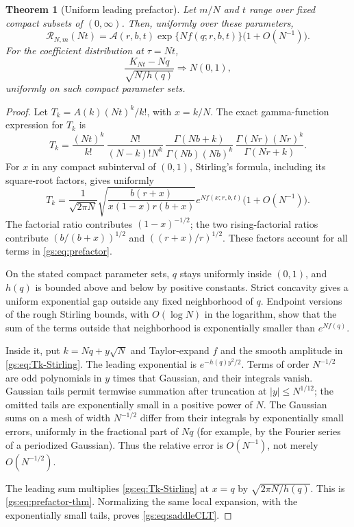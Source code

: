 \documentclass[11pt,a4paper]{article}
\numberwithin{equation}{section}
\newtheorem{theorem}{Theorem}[section]
\theoremstyle{definition}
\theoremstyle{remark}
\newcommand{\Rgs}{\mathcal R}
\begin{document}
\begin{theorem}[Uniform leading prefactor]\label{gs:thm:prefactor}
Let $m/N$ and $t$ range over fixed compact subsets of $(0,\infty)$.
Then, uniformly over these parameters,
\begin{equation}\label{gs:eq:prefactor-thm}
 \Rgs_{N,m}(Nt)=\mathcal A(r,b,t)
       \exp\{Nf(q;r,b,t)\}\bigl(1+O(N^{-1})\bigr).
\end{equation}
For the coefficient distribution at $\tau=Nt$,
\begin{equation}\label{gs:eq:saddleCLT}
 \frac{K_{Nt}-Nq}{\sqrt{N/h(q)}}\Longrightarrow N(0,1),
\end{equation}
uniformly on such compact parameter sets.
\end{theorem}
\begin{proof}
Let $T_k=A(k)(Nt)^k/k!$, with $x=k/N$.
The exact gamma-function expression for $T_k$ is
\begin{equation}\label{gs:eq:Tk}
 T_k=\frac{(Nt)^k}{k!}\,
 \frac{N!}{(N-k)!N^k}\,
 \frac{\Gamma(Nb+k)}{\Gamma(Nb)(Nb)^k}\,
 \frac{\Gamma(Nr)(Nr)^k}{\Gamma(Nr+k)}.
\end{equation}
For $x$ in any compact subinterval of $(0,1)$, Stirling's formula, including
its square-root factors, gives uniformly
\begin{equation}\label{gs:eq:Tk-Stirling}
 T_k=\frac1{\sqrt{2\pi N}}
 \sqrt{\frac{b(r+x)}{x(1-x)r(b+x)}}
 e^{Nf(x;r,b,t)}\bigl(1+O(N^{-1})\bigr).
\end{equation}
The factorial ratio contributes $(1-x)^{-1/2}$; the two rising-factorial
ratios contribute $(b/(b+x))^{1/2}$ and $((r+x)/r)^{1/2}$.
These factors account for all terms in \eqref{gs:eq:prefactor}.

On the stated compact parameter sets, $q$ stays uniformly inside $(0,1)$,
and $h(q)$ is bounded above and below by positive constants. Strict
concavity gives a uniform exponential gap outside any fixed neighborhood
of $q$. Endpoint versions of the rough Stirling bounds, with $O(\log N)$
in the logarithm, show that the sum of the terms outside that neighborhood
is exponentially smaller than $e^{Nf(q)}$.

Inside it, put $k=Nq+y\sqrt N$ and Taylor-expand $f$ and the smooth
amplitude in \eqref{gs:eq:Tk-Stirling}. The leading exponential is
$e^{-h(q)y^2/2}$. Terms of order $N^{-1/2}$ are odd polynomials in $y$
times that Gaussian, and their integrals vanish. Gaussian tails permit
termwise summation after truncation at $|y|\le N^{1/12}$; the omitted tails
are exponentially small in a positive power of $N$. The Gaussian sums on
a mesh of width $N^{-1/2}$ differ from their integrals by exponentially
small errors, uniformly in the fractional part of $Nq$ (for example, by
the Fourier series of a periodized Gaussian). Thus the relative error is
$O(N^{-1})$, not merely $O(N^{-1/2})$.

The leading sum multiplies \eqref{gs:eq:Tk-Stirling} at $x=q$ by
$\sqrt{2\pi N/h(q)}$. This is \eqref{gs:eq:prefactor-thm}.
Normalizing the same local expansion, with the exponentially small tails,
proves \eqref{gs:eq:saddleCLT}.
\end{proof}
\end{document}
